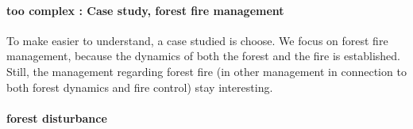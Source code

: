 \documentclass{article}
\begin{document}

\paragraph{too complex : Case study, forest fire management \\}

To make easier to understand, a case studied is choose. We focus on forest fire management, because the dynamics of both the forest and the fire is established. Still, the management regarding forest fire (in other management in connection to both forest dynamics and fire control) stay interesting.



\newpage


\paragraph{forest disturbance}
\end{document}
